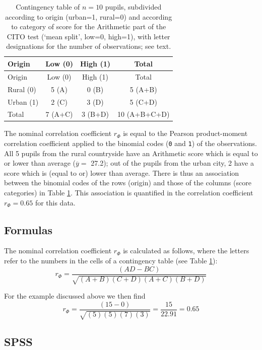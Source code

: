 \documentclass[
]{book}
\begin{document}
\begin{longtable}[]{@{}lccc@{}}
\caption{\label{tab:cito-contingency-table} Contingency table of \(n=10\) pupils, subdivided according
to origin (urban=1, rural=0) and according to category of score for the Arithmetic part of
the CITO test (`mean split', low=0, high=1), with letter designations for the number
of observations; see text.}\tabularnewline
\toprule
Origin & Low (0) & High (1) & Total\tabularnewline
\midrule
\endfirsthead
\toprule
Origin & Low (0) & High (1) & Total\tabularnewline
\midrule
\endhead
Rural (0) & 5 (A) & 0 (B) & 5 (A+B)\tabularnewline
Urban (1) & 2 (C) & 3 (D) & 5 (C+D)\tabularnewline
Total & 7 (A+C) & 3 (B+D) & 10 (A+B+C+D)\tabularnewline
\bottomrule
\end{longtable}

The nominal correlation coefficient \(r_\Phi\) is equal to the Pearson
product-moment correlation coefficient applied to the binomial codes
(\texttt{0} and \texttt{1}) of the observations. All 5 pupils from the rural countryside
have an Arithmetic score which is equal to or lower than average
(\(\overline{y}=\) 27.2); out of the pupils from the urban city, 2 have a
score which is (equal to or) lower than average. There is thus an association\\
between the binomial codes of the rows (origin) and those of the columns
(score categories) in Table \ref{tab:cito-contingency-table}.
This association is quantified in the
correlation coefficient \(r_\Phi=0.65\) for this data.

\hypertarget{formulas-5}{%
\subsection{Formulas}\label{formulas-5}}

The nominal correlation coefficient \(r_\Phi\) is calculated as follows,
where the letters refer to the numbers in the cells of a contingency table
(see Table \ref{tab:cito-contingency-table}):
\begin{equation}
    r_\Phi = \frac{(AD-BC)}{\sqrt{(A+B)(C+D)(A+C)(B+D)}}
  \label{eq:phi}
\end{equation}

For the example discussed above we then find
\[
    r_\Phi = \frac{(15-0)}{\sqrt{(5)(5)(7)(3)}} = \frac{15}{22.91} = 0.65
\]

\hypertarget{spss-8}{%
\subsection{SPSS}\label{spss-8}}
\end{document}
